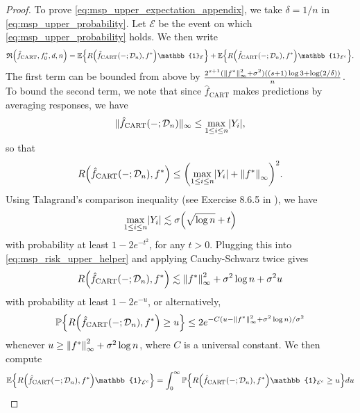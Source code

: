 \documentclass[11pt]{article}
\DeclarePairedDelimiter{\braces}{\lbrace}{\rbrace}
\DeclarePairedDelimiter{\paren}{(}{)}
\DeclarePairedDelimiter{\abs}{|}{|}
\DeclarePairedDelimiter{\norm}{\|}{\|}
\renewcommand{\P}{\mathbb{P}}
\newcommand{\E}{\mathbb{E}}
\newcommand{\indicator}{\mathbb{1}}
\newcommand{\sparsity}{s}
\newcommand{\nfeats}{d}
\newcommand{\nsamples}{n}
\newcommand{\data}[1][n]{\mathcal{D}_{#1}}
\newcommand{\fcart}{\hat{f}_{\operatorname{CART}}}
\newcommand{\objective}{\mathfrak{R}}
\begin{document}
\begin{proof}
    To prove \eqref{eq:msp_upper_expectation_appendix}, we take $\delta = 1/n$ in \eqref{eq:msp_upper_probability}.
    Let $\mathcal{E}$ be the event on which \eqref{eq:msp_upper_probability} holds.
    We then write
    \begin{equation}
        \objective\paren*{\fcart, f^*_0,\nfeats,\nsamples} = \E\braces*{R\paren*{\fcart(-;\data),f^*}\indicator_\mathcal{E}} + \E\braces*{R\paren*{\fcart(-;\data),f^*}\indicator_{\mathcal{E}^c}}.
    \end{equation}
    The first term can be bounded from above by $\frac{2^{\sparsity+1}(\norm{f^*}_\infty^2 + \sigma^2)\paren*{(s+1)\log 3 +\log(2/\delta)}}{n}$.
    To bound the second term, we note that since $\fcart$ makes predictions by averaging responses, we have 
    \begin{equation}
        \|\fcart(-;\data)\|_{\infty} \leq \max_{1 \leq i \leq \nsamples} \abs*{Y_i}, 
    \end{equation}
    so that
    \begin{equation}
    \label{eq:msp_risk_upper_helper}
        R\paren*{\fcart(-;\data),f^*} \leq \paren*{\max_{1 \leq i \leq \nsamples} \abs*{Y_i} + \norm*{f^*}_\infty}^2.
    \end{equation}
    Using Talagrand's comparison inequality (see Exercise 8.6.5 in \cite{vershynin2018high}), we have
    \begin{equation}
        \max_{1 \leq i \leq \nsamples} \abs*{Y_i} \lesssim \sigma\paren*{\sqrt{\log \nsamples} + t}
    \end{equation}
    with probability at least $1-2e^{-t^2}$, for any $t > 0$.
    Plugging this into \eqref{eq:msp_risk_upper_helper} and applying Cauchy-Schwarz twice gives
    \begin{equation}
        R\paren*{\fcart(-;\data),f^*} \lesssim \norm*{f^*}_\infty^2 + \sigma^2\log\nsamples + \sigma^2u
    \end{equation}
    with probability at least $1 - 2e^{-u}$, or alternatively,
    \begin{equation}
        \P\braces*{R\paren*{\fcart(-;\data),f^*} \geq u } \leq 2e^{-C(u-\norm{f^*}_\infty^2 + \sigma^2\log\nsamples)/\sigma^2}
    \end{equation}
    whenever $u \geq \norm*{f^*}_\infty^2 + \sigma^2\log\nsamples$, where $C$ is a universal constant.
    We then compute
    \begin{equation}
        \begin{split}
            \E\braces*{R\paren*{\fcart(-;\data),f^*}\indicator_{\mathcal{E}^c}} & = \int_0^\infty \P\braces*{R\paren*{\fcart(-;\data),f^*}\indicator_{\mathcal{E}^c} \geq u} du \\

\end{split}
\end{equation}
\end{proof}
\end{document}
